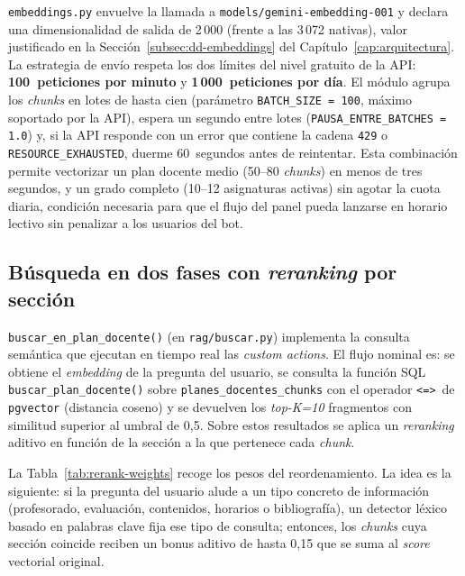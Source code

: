\texttt{embeddings.py} envuelve la llamada a \texttt{models/gemini-embedding-001} y declara una dimensionalidad de salida de 2\,000 (frente a las 3\,072 nativas), valor justificado en la Sección~\ref{subsec:dd-embeddings} del Capítulo~\ref{cap:arquitectura}. La estrategia de envío respeta los dos límites del nivel gratuito de la API: \textbf{100~peticiones por minuto} y \textbf{1\,000~peticiones por día}. El módulo agrupa los \textit{chunks} en lotes de hasta cien (parámetro \texttt{BATCH\_SIZE = 100}, máximo soportado por la API), espera un segundo entre lotes (\texttt{PAUSA\_ENTRE\_BATCHES = 1.0}) y, si la API responde con un error que contiene la cadena \texttt{429} o \texttt{RESOURCE\_EXHAUSTED}, duerme 60~segundos antes de reintentar. Esta combinación permite vectorizar un plan docente medio (50--80 \textit{chunks}) en menos de tres segundos, y un grado completo (10--12 asignaturas activas) sin agotar la cuota diaria, condición necesaria para que el flujo del panel pueda lanzarse en horario lectivo sin penalizar a los usuarios del bot.

\subsection{Búsqueda en dos fases con \textit{reranking} por sección}\label{subsec:impl-rag-busqueda}

\texttt{buscar\_en\_plan\_docente()} (en \texttt{rag/buscar.py}) implementa la consulta semántica que ejecutan en tiempo real las \textit{custom actions}. El flujo nominal es: se obtiene el \textit{embedding} de la pregunta del usuario, se consulta la función SQL \texttt{buscar\_plan\_docente()} sobre \texttt{planes\_docentes\_chunks} con el operador \texttt{<=>}~de \texttt{pgvector} (distancia coseno) y se devuelven los \textit{top-K=10} fragmentos con similitud superior al umbral de 0,5. Sobre estos resultados se aplica un \textit{reranking} aditivo en función de la sección a la que pertenece cada \textit{chunk}.

La Tabla~\ref{tab:rerank-weights} recoge los pesos del reordenamiento. La idea es la siguiente: si la pregunta del usuario alude a un tipo concreto de información (profesorado, evaluación, contenidos, horarios o bibliografía), un detector léxico basado en palabras clave fija ese tipo de consulta; entonces, los \textit{chunks} cuya sección coincide reciben un bonus aditivo de hasta 0,15 que se suma al \textit{score} vectorial original.

